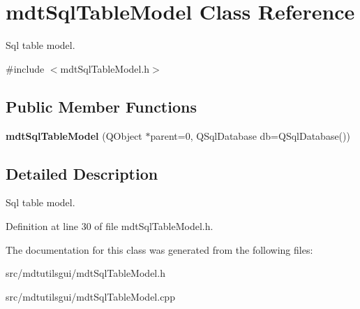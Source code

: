 \hypertarget{classmdt_sql_table_model}{
\section{mdtSqlTableModel Class Reference}
\label{classmdt_sql_table_model}
}


Sql table model.  




{\ttfamily \#include $<$mdtSqlTableModel.h$>$}

\subsection*{Public Member Functions}
\begin{DoxyCompactItemize}
\item 
\hypertarget{classmdt_sql_table_model_ad423c1b0c74ecbbb575637b028c2574b}{
{\bfseries mdtSqlTableModel} (QObject $\ast$parent=0, QSqlDatabase db=QSqlDatabase())}
\label{classmdt_sql_table_model_ad423c1b0c74ecbbb575637b028c2574b}

\end{DoxyCompactItemize}


\subsection{Detailed Description}
Sql table model. 

Definition at line 30 of file mdtSqlTableModel.h.



The documentation for this class was generated from the following files:\begin{DoxyCompactItemize}
\item 
src/mdtutilsgui/mdtSqlTableModel.h\item 
src/mdtutilsgui/mdtSqlTableModel.cpp\end{DoxyCompactItemize}
